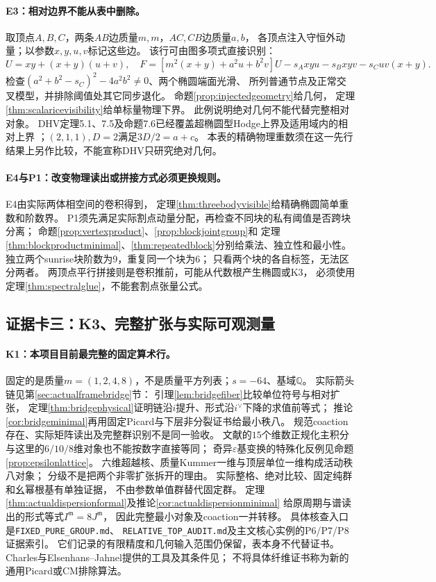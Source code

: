 \documentclass[11pt,a4paper]{ctexart}
\theoremstyle{cnplain}\newtheorem{theorem}{定理}[section]
\theoremstyle{definition}\newtheorem{definition}[theorem]{定义}
\theoremstyle{remark}\newtheorem{remark}[theorem]{注}
\newcommand{\Q}{\mathbb Q}\newcommand{\cC}{\mathcal C}
\begin{document}
\paragraph{E3：相对边界不能从表中删除。}
取顶点$A,B,C$，两条$AB$边质量$m,m$，$AC,CB$边质量$a,b$，
各顶点注入守恒外动量；以参数$x,y,u,v$标记这些边。
该行可由图多项式直接识别：
\[
 U=xy+(x+y)(u+v),\quad
 F=[m^2(x+y)+a^2u+b^2v]U-s_Axyu-s_Bxyv-s_Cuv(x+y).
\]
检查$(a^2+b^2-s_C)^2-4a^2b^2\ne0$、两个椭圆端面光滑、
所列普通节点及正常交叉模型，并排除阈值处其它同步退化。
命题\ref{prop:injectedgeometry}给几何，
定理\ref{thm:scalaricevisibility}给单标量物理下界。
此例说明绝对几何不能代替完整相对对象。
DHV定理5.1、7.5及命题7.6已经覆盖超椭圆型Hodge上界及适用域内的相对上界
\cite{DHV}；$(2,1,1),D=2$满足$3D/2=a+c$。
本表的精确物理重数须在这一先行结果上另作比较，不能宣称DHV只研究绝对几何。

\paragraph{E4与P1：改变物理读出或拼接方式必须更换规则。}
E4由实际两体相空间的卷积得到，
定理\ref{thm:threebodyvisible}给精确椭圆简单重数和阶数界。
P1须先满足实际割点动量分配，再检查不同块的私有阈值是否跨块分离；
命题\ref{prop:vertexproduct}、\ref{prop:blockjointgroup}和
定理\ref{thm:blockproductminimal}、\ref{thm:repeatedblock}分别给乘法、独立性和最小性。
独立两个sunrise块阶数为9，重复同一个块为6；
只看两个块的各自标签，无法区分两者。
两顶点平行拼接则是卷积推前，可能从代数根产生椭圆或K3，
必须使用定理\ref{thm:spectralglue}，不能套割点张量公式。

\subsection{证据卡三：K3、完整扩张与实际可观测量}
\label{subsec:classkthree}
\paragraph{K1：本项目目前最完整的固定算术行。}
固定的是质量$m=(1,2,4,8)$，不是质量平方列表；$s=-64$、基域$\Q$。
实际箭头链见第\ref{sec:actualframebridge}节：
引理\ref{lem:bridgefiber}比较单位符号与相对扩张，
定理\ref{thm:bridgephysical}证明链沿$i$提升、形式沿$i^\vee$下降的求值前等式；
推论\ref{cor:bridgeminimal}再用固定Picard与下层非分裂证书给最小秩八。
规范coaction存在、实际矩阵读出及完整群识别不是同一验收。
文献的$15$个维数正规化主积分与这里的$6/10/8$维对象也不能按数字直接等同；
奇异$\varepsilon$基变换的特殊化反例见命题\ref{prop:epsilonlattice}。
六维超越核、质量Kummer一维与顶层单位一维构成活动秩八对象；
分级不是把两个非零扩张拆开的理由。
实际整格、绝对比较、固定纯群和幺幂根基有单独证据，
不由参数单值群替代固定群。
定理\ref{thm:actualdispersionformal}及推论\ref{cor:actualdispersionminimal}
给原周期与谱读出的形式等式$I^{\mathfrak m}=8J^{\mathfrak m}$，
因此完整最小对象及coaction一并转移。
具体核查入口是\texttt{FIXED\_PURE\_GROUP.md}、
\texttt{RELATIVE\_TOP\_AUDIT.md}及主文核心实例的P6/P7/P8证据索引。
它们记录的有限精度和几何输入范围仍保留，表本身不代替证书。
Charles与Elsenhans--Jahnel提供的工具及其条件见\cite{LitCharles,LitEJ}；
不将具体纤维证书称为新的通用Picard或CM排除算法。
\end{document}
